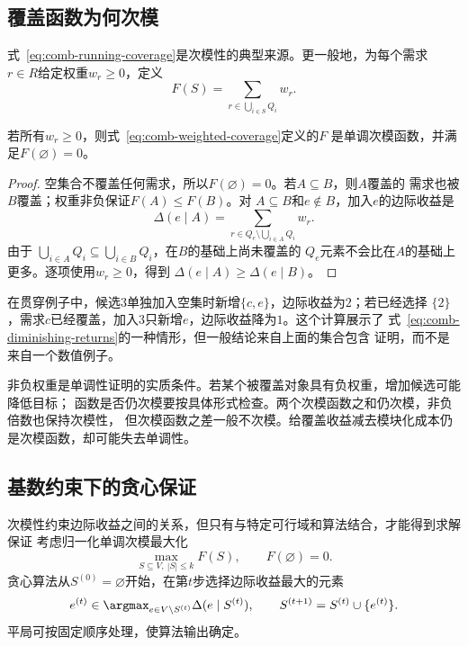 \subsection{覆盖函数为何次模}

式~\eqref{eq:comb-running-coverage}是次模性的典型来源。更一般地，为每个需求
$r\in R$给定权重$w_r\geq0$，定义
\begin{equation}
  F(S)
  =
  \sum_{r\in\bigcup_{i\in S}Q_i}w_r.
  \label{eq:comb-weighted-coverage}
\end{equation}

\begin{theorem}[非负加权覆盖函数单调且次模]
\label{thm:comb-coverage-submodular}
若所有$w_r\geq0$，则式~\eqref{eq:comb-weighted-coverage}定义的$F$
是单调次模函数，并满足$F(\varnothing)=0$。
\end{theorem}

\begin{proof}
空集合不覆盖任何需求，所以$F(\varnothing)=0$。若$A\subseteq B$，则$A$覆盖的
需求也被$B$覆盖；权重非负保证$F(A)\leq F(B)$。对
$A\subseteq B$和$e\notin B$，加入$e$的边际收益是
\[
  \Delta(e\mid A)
  =
  \sum_{r\in Q_e\setminus\bigcup_{i\in A}Q_i}w_r.
\]
由于
$\bigcup_{i\in A}Q_i\subseteq\bigcup_{i\in B}Q_i$，在$B$的基础上尚未覆盖的
$Q_e$元素不会比在$A$的基础上更多。逐项使用$w_r\geq0$，得到
$\Delta(e\mid A)\geq\Delta(e\mid B)$。
\end{proof}

在贯穿例子中，候选$3$单独加入空集时新增$\{c,e\}$，边际收益为$2$；若已经选择
$\{2\}$，需求$c$已经覆盖，加入$3$只新增$e$，边际收益降为$1$。这个计算展示了
式~\eqref{eq:comb-diminishing-returns}的一种情形，但一般结论来自上面的集合包含
证明，而不是来自一个数值例子。

非负权重是单调性证明的实质条件。若某个被覆盖对象具有负权重，增加候选可能降低目标；
函数是否仍次模要按具体形式检查。两个次模函数之和仍次模，非负倍数也保持次模性，
但次模函数之差一般不次模。给覆盖收益减去模块化成本仍是次模函数，却可能失去单调性。

\subsection{基数约束下的贪心保证}

次模性约束边际收益之间的关系，但只有与特定可行域和算法结合，才能得到求解保证
考虑归一化单调次模最大化
\[
  \max_{S\subseteq V,\ |S|\leq k}F(S),
  \qquad F(\varnothing)=0.
\]
贪心算法从$S^{(0)}=\varnothing$开始，在第$t$步选择边际收益最大的元素
\[
  e^{(t)}\in\argmax_{e\in V\setminus S^{(t)}}\Delta(e\mid S^{(t)}),
  \qquad
  S^{(t+1)}=S^{(t)}\cup\{e^{(t)}\}.
\]
平局可按固定顺序处理，使算法输出确定。

